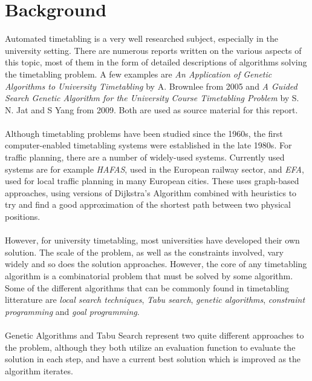 \documentclass[titlepage,a4paper]{article}
\begin{document}
\section{Background}
Automated timetabling is a very well researched subject, especially in the university setting. There are numerous reports written on the various aspects of this topic, most of them in the form of detailed descriptions of algorithms solving the timetabling problem. A few examples are \emph{An Application of Genetic Algorithms to University Timetabling} by A. Brownlee from 2005 and \emph{A Guided Search Genetic Algorithm for the University Course Timetabling Problem} by S. N. Jat and S Yang from 2009. Both are used as source material for this report. \\\\
Although timetabling problems have been studied since the 1960s\cite{efficient03}, the first computer-enabled timetabling systems were established in the late 1980s\cite{timeTableInfo06}. For traffic planning, there are a number of widely-used systems. Currently used systems are for example \emph{HAFAS}, used in the European railway sector, and \emph{EFA}, used for local traffic planning in many European cities. These uses graph-based approaches, using versions of Dijkstra’s Algorithm combined with heuristics to try and find a good approximation of the shortest path between two physical positions\cite{timeTableInfo06}. \\\\
However, for university timetabling, most universities have developed their own solution\cite{efficient10}. The scale of the problem, as well as the constraints involved, vary widely and so does the solution approaches. However, the core of any timetabling algorithm is a combinatorial problem that must be solved by some algorithm. Some of the different algorithms that can be commonly found in timetabling litterature are \emph{local search techniques}, \emph{Tabu search}, \emph{genetic algorithms}, \emph{constraint programming} and \emph{goal programming}\cite{efficient03}. \\\\
Genetic Algorithms and Tabu Search represent two quite different approaches to the problem, although they both utilize an evaluation function to evaluate the solution in each step, and have a current best solution which is improved as the algorithm iterates.
\end{document}
